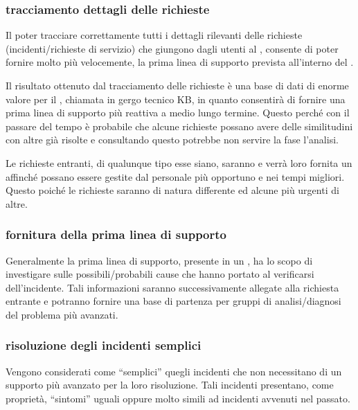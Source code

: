 \subsubsection[Tracciamento dettagli delle richieste]{tracciamento dettagli delle richieste}
Il poter tracciare correttamente tutti i dettagli rilevanti delle richieste (incidenti/richieste di servizio) che giungono dagli utenti al , consente di poter fornire molto più velocemente, la prima linea di supporto prevista all'interno del .

Il risultato ottenuto dal tracciamento delle richieste è una base di dati di enorme valore per il , chiamata in gergo tecnico \ac{KB}, in quanto consentirà di fornire una prima linea di supporto più reattiva a medio lungo termine. Questo perché con il passare del tempo è probabile che alcune richieste possano avere delle similitudini con altre già risolte e consultando questo  potrebbe non servire la fase l'analisi.

Le richieste entranti, di qualunque tipo esse siano, saranno  e verrà loro fornita un  affinché possano essere gestite dal personale più opportuno e nei tempi migliori. Questo poiché le richieste saranno di natura differente ed alcune più urgenti di altre.

\subsubsection[Fornitura della prima linea di supporto]{fornitura della prima linea di supporto}
Generalmente la prima linea di supporto, presente in un , ha lo scopo di investigare sulle possibili/probabili cause che hanno portato al verificarsi dell'incidente. Tali informazioni saranno successivamente allegate alla richiesta entrante e potranno fornire una base di partenza per gruppi di analisi/diagnosi del problema più avanzati.

\subsubsection[Risoluzione degli incidenti semplici]{risoluzione degli incidenti semplici}
Vengono considerati come ``semplici'' quegli incidenti che non necessitano di un supporto più avanzato per la loro risoluzione. Tali incidenti presentano, come proprietà, ``sintomi'' uguali oppure molto simili ad incidenti avvenuti nel passato.

